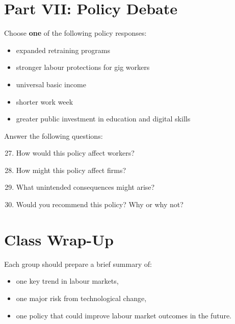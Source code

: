 \documentclass[12pt]{article}
\begin{document}
\newpage

\section*{Part VII: Policy Debate}

Choose \textbf{one} of the following policy responses:

\begin{itemize}
\item expanded retraining programs
\item stronger labour protections for gig workers
\item universal basic income
\item shorter work week
\item greater public investment in education and digital skills
\end{itemize}

Answer the following questions:

\begin{enumerate}[label=\arabic*.]
\setcounter{enumi}{26}
\item How would this policy affect workers?
\vspace{2cm}

\item How might this policy affect firms?
\vspace{2cm}

\item What unintended consequences might arise?
\vspace{2.5cm}

\item Would you recommend this policy? Why or why not?
\vspace{2.5cm}
\end{enumerate}

\vspace{1em}

\section*{Class Wrap-Up}

Each group should prepare a brief summary of:
\begin{itemize}
\item one key trend in labour markets,
\item one major risk from technological change,
\item one policy that could improve labour market outcomes in the future.
\end{itemize}
\end{document}
